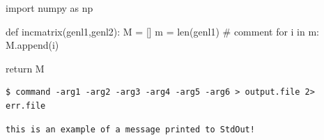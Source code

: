 

\begin{python}
import numpy as np
    
def incmatrix(genl1,genl2):
    M = []
    m = len(genl1)  # comment 
    for i in m:
        M.append(i)
    
    return M
\end{python}

\begin{lstlisting}
$ command -arg1 -arg2 -arg3 -arg4 -arg5 -arg6 > output.file 2> err.file
\end{lstlisting}

\begin{lstlisting}[columns=flexible]
this is an example of a message printed to StdOut!
\end{lstlisting}


